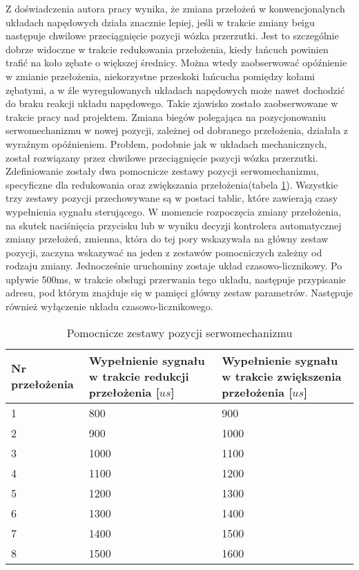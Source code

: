 Z doświadczenia autora pracy wynika, że zmiana przełożeń w konwencjonalynch układach napędowych działa znacznie lepiej, jeśli w trakcie zmiany beigu następuje chwilowe przeciągnięcie pozycji wózka przerzutki. Jest to szczególnie dobrze widoczne w trakcie redukowania przełożenia, kiedy łańcuch powinien trafić na koło zębate o większej średnicy. Można wtedy zaobserwować opóźnienie w zmianie przełożenia, niekorzystne przeskoki łańcucha pomiędzy kołami zębatymi, a w źle wyregulowanych układach napędowych może nawet dochodzić do braku reakcji układu napędowego. Takie zjawisko zostało zaobserwowane w trakcie pracy nad projektem. Zmiana biegów polegająca na pozycjonowaniu serwomechanizmu w nowej pozycji, zależnej od dobranego przełożenia, działała z wyraźnym opóźnieniem. Problem, podobnie jak w układach mechanicznych, został rozwiązany przez chwilowe przeciągnięcie pozycji wózka przerzutki. Zdefiniowanie zostały dwa pomocnicze zestawy pozycji serwomechanizmu, specyficzne dla redukowania oraz zwiększania przełożenia(tabela \ref{tab:przelozeniaPomocniczne}). Wszystkie trzy zestawy pozycji przechowywane są w postaci tablic, które zawierają czasy wypełnienia sygnału sterującego. W momencie rozpoczęcia zmiany przełożenia, na skutek naciśnięcia przycisku lub w wyniku decyzji kontrolera automatycznej zmiany przełożeń, zmienna, która do tej pory wskazywała na główny zestaw pozycji, zaczyna wskazywać na jeden z zestawów pomocniczych zależny od rodzaju zmiany. Jednocześnie uruchominy zostaje układ czasowo-licznikowy. Po upływie 500ms, w trakcie obsługi przerwania tego układu, następuje przypisanie adresu, pod którym znajduje się w pamięci główny zestaw parametrów. Następuje również wyłączenie układu czasowo-licznikowego. 


\begin{table}[h]
    \caption{Pomocnicze zestawy pozycji serwomechanizmu}
    \begin{center}
		\label{tab:przelozeniaPomocniczne}
		\begin{tabular}{|p{2.3cm}|p{5cm}|p{5cm}|}
			\hline
 			Nr przełożenia & Wypełnienie sygnału w trakcie redukcji przełożenia [$us$] & 
Wypełnienie sygnału w trakcie zwiększenia przełożenia [$us$] \\
 			\hline
 			1 & 800 & 900 \\  
			2 & 900 & 1000 \\
			3 & 1000 & 1100 \\  
			4 & 1100 & 1200 \\  
			5 & 1200 & 1300 \\  
			6 & 1300 & 1400 \\  
			7 & 1400 & 1500 \\  
			8 & 1500 & 1600 \\  
			\hline
		\end{tabular}
	\end{center}
\end{table}

